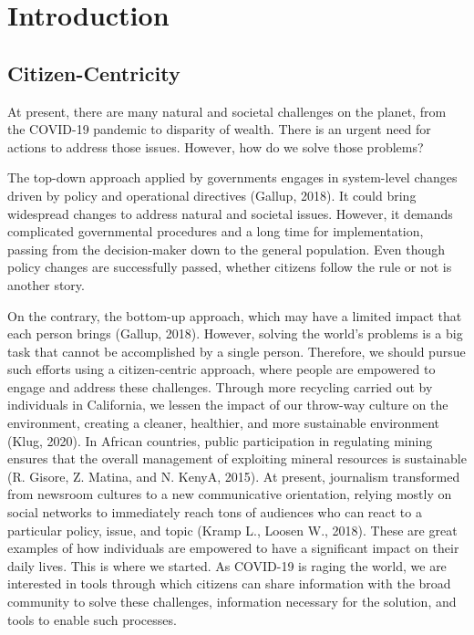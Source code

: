 \documentclass{ucsdreport}
\begin{document}
\section{Introduction}

\subsection{Citizen-Centricity}
At present, there are many natural and societal challenges on the planet, from 
the COVID-19 pandemic to disparity of wealth. There is an urgent need for 
actions to address those issues. However, how do we solve those problems?

The top-down approach applied by governments engages in system-level changes 
driven by policy and operational directives (Gallup, 2018). It could bring 
widespread changes to address natural and societal issues. However, it demands
complicated governmental procedures and a long time for implementation, passing
from the decision-maker down to the general population. Even though policy 
changes are successfully passed, whether citizens follow the rule or not is 
another story. 

On the contrary, the bottom-up approach, which may have a limited impact that 
each person brings (Gallup, 2018). However, solving the world’s problems is a 
big task that cannot be accomplished by a single person. Therefore, we should pursue such 
efforts using a citizen-centric approach, where people are empowered to engage 
and address these challenges. Through more recycling carried out by individuals
in California, we lessen the impact of our throw-way culture on the environment, 
creating a cleaner, healthier, and more sustainable environment (Klug, 2020). 
In African countries, public participation in regulating mining ensures that 
the overall management of exploiting mineral resources is sustainable 
(R. Gisore, Z. Matina, and N. KenyA, 2015). At present, journalism transformed 
from newsroom cultures to a new communicative orientation, relying mostly on
social networks to immediately reach tons of audiences who can react to a 
particular policy, issue, and topic (Kramp L., Loosen W., 2018). These are
great examples of how individuals are empowered to have a significant impact 
on their daily lives. This is where we started. As COVID-19 is raging
the world, we are interested in tools through which citizens can share 
information with the broad community to solve these challenges, information 
necessary for the solution, and tools to enable such processes. 
\end{document}
